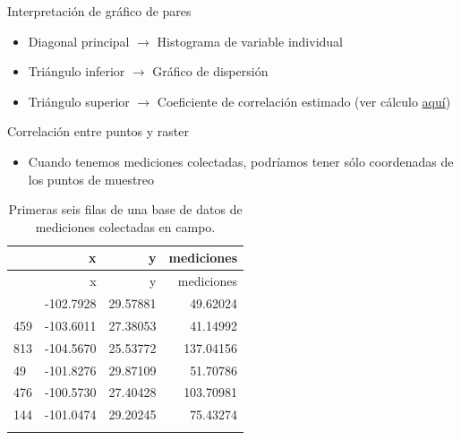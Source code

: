 \documentclass[
  11pt,
  ignorenonframetext,
]{beamer}
\providecommand{\tightlist}{%
  \setlength{\itemsep}{0pt}\setlength{\parskip}{0pt}}
\begin{document}
\begin{frame}{Interpretación de gráfico de pares}
\protect\hypertarget{interpretaciuxf3n-de-gruxe1fico-de-pares}{}
\begin{itemize}
\item
  Diagonal principal \(\rightarrow\) Histograma de variable individual
\item
  Triángulo inferior \(\rightarrow\) Gráfico de dispersión
\item
  Triángulo superior \(\rightarrow\) Coeficiente de correlación estimado
  (ver cálculo \href{Correlacion.pdf}{aquí})
\end{itemize}
\end{frame}

\begin{frame}{Correlación entre puntos y raster}
\protect\hypertarget{correlaciuxf3n-entre-puntos-y-raster}{}
\begin{itemize}
\tightlist
\item
  Cuando tenemos mediciones colectadas, podríamos tener sólo coordenadas
  de los puntos de muestreo
\end{itemize}

\begin{longtable}[]{@{}lrrr@{}}
\caption{Primeras seis filas de una base de datos de mediciones
colectadas en campo.}\tabularnewline
\toprule\noalign{}
& x & y & mediciones \\
\midrule\noalign{}
\endfirsthead
\toprule\noalign{}
& x & y & mediciones \\
\midrule\noalign{}
\endhead
73 & -102.7928 & 29.57881 & 49.62024 \\
459 & -103.6011 & 27.38053 & 41.14992 \\
813 & -104.5670 & 25.53772 & 137.04156 \\
49 & -101.8276 & 29.87109 & 51.70786 \\
476 & -100.5730 & 27.40428 & 103.70981 \\
144 & -101.0474 & 29.20245 & 75.43274 \\
\bottomrule\noalign{}
\end{longtable}
\end{frame}
\end{document}
